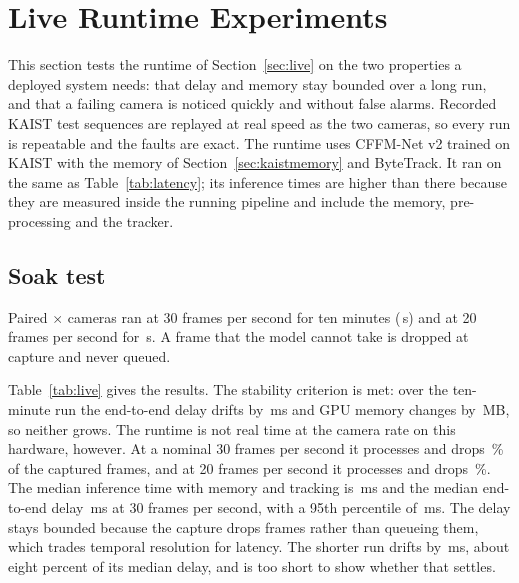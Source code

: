 \section{Live Runtime Experiments}
\label{sec:livexp}
This section tests the runtime of Section~\ref{sec:live} on the two properties a deployed system needs: that delay and memory stay bounded over a long run, and that a failing camera is noticed quickly and without false alarms. Recorded KAIST test sequences are replayed at real speed as the two cameras, so every run is repeatable and the faults are exact. The runtime uses CFFM-Net v2 trained on KAIST with the memory of Section~\ref{sec:kaistmemory} and ByteTrack. It ran on the same \latLocalDevice{} as Table~\ref{tab:latency}; its inference times are higher than there because they are measured inside the running pipeline and include the memory, pre-processing and the tracker.

\subsection{Soak test}
\label{sec:soak}
Paired \cfgLatW{}$\times$\cfgLatH{} cameras ran at 30 frames per second for ten minutes (\livSoakThirtySeconds{}\,s) and at 20 frames per second for \cfgSoakShortSeconds{}\,s. A frame that the model cannot take is dropped at capture and never queued.



Table~\ref{tab:live} gives the results. The stability criterion is met: over the ten-minute run the end-to-end delay drifts by \livSoakThirtyDriftMs{}\,ms and GPU memory changes by \livSoakThirtyGpuGrowthMb{}\,MB, so neither grows. The runtime is not real time at the camera rate on this hardware, however. At a nominal 30 frames per second it processes \livSoakThirtyFps{} and drops \livSoakThirtyDropPercent{}\,\% of the captured frames, and at 20 frames per second it processes \livSoakTwentyFps{} and drops \livSoakTwentyDropPercent{}\,\%. The median inference time with memory and tracking is \livSoakThirtyInferMedianMs{}\,ms and the median end-to-end delay \livSoakThirtyEndToEndMedianMs{}\,ms at 30 frames per second, with a 95th percentile of \livSoakThirtyEndToEndPNinetyFiveMs{}\,ms. The delay stays bounded because the capture drops frames rather than queueing them, which trades temporal resolution for latency. The shorter run drifts by \livSoakTwentyDriftMs{}\,ms, about eight percent of its median delay, and is too short to show whether that settles.


